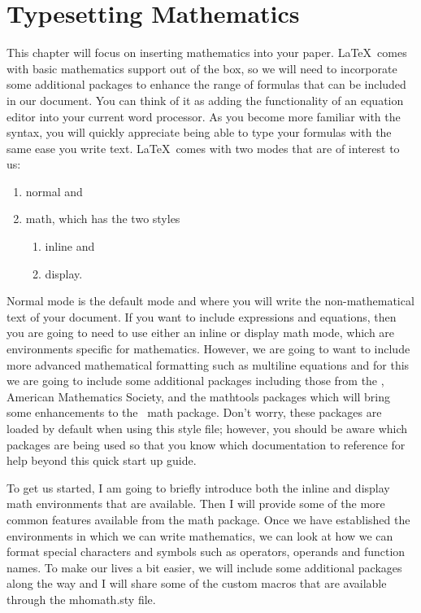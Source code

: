 \chapter{Typesetting Mathematics}

This chapter will focus on inserting mathematics into your paper. \LaTeX\ comes 
with basic mathematics support out of the box, so we will need to 
incorporate some additional packages to enhance the range of formulas that can 
be included in our document.  You can think of it as adding the functionality 
of an equation editor into your current word processor. As you become more 
familiar with the syntax, you will quickly appreciate being able to type
your formulas with the same ease you write text.
\LaTeX\ comes with two modes that are of interest to us:
\begin{enumerate}
  \item normal and
  \item math, which has the two styles
  \begin{enumerate}
    \item inline and
    \item display.
  \end{enumerate}
\end{enumerate}
Normal mode is the default mode and where you will write the non-mathematical text
of your document.  If you want to include expressions and equations,
then you are going to need to use either an inline or display math mode, 
which are environments specific for mathematics.  However, we are going to
want to include more advanced mathematical formatting such as multiline 
equations and for this we are going to include some additional packages
including those from the \AmS, American Mathematics Society, and the mathtools\cite{CTANmathtools}
packages which will bring some enhancements to the \AmS\ math package\cite{CTANamsmath}.  Don't worry,
these packages are loaded by default when using this style file; however, 
you should be aware which packages are being used so that you know which 
documentation to reference for help beyond this quick start up guide.

To get us started, I am going to briefly introduce both the inline and 
display math environments that are available.  Then I will provide some of the 
more common features available from the \AmS math package.  Once we have 
established the environments in which we can write mathematics, we can look
at how we can format special characters  and symbols such as operators, 
operands and function names.  To make our lives a bit easier, we will include
some additional packages along the way and I will share some of the custom
macros that are available through the mhomath.sty file.


